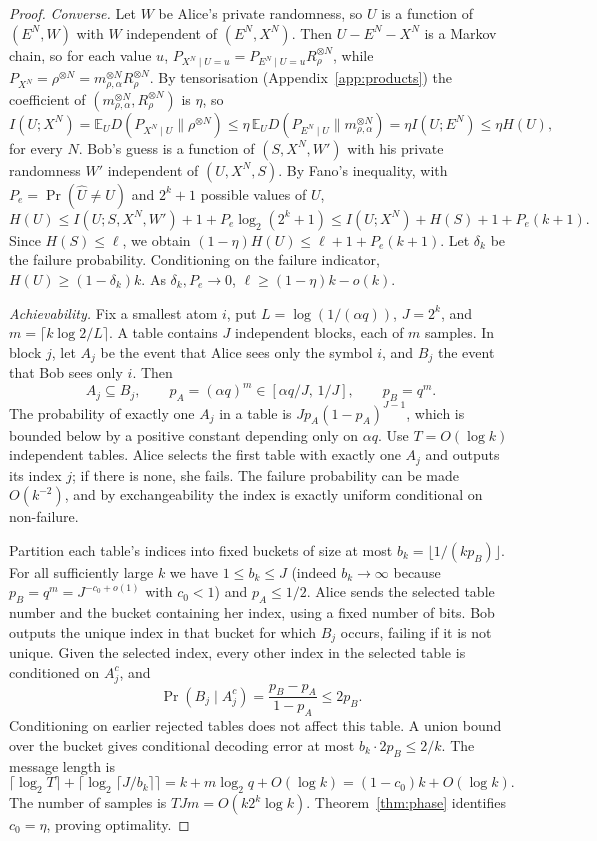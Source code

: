 \documentclass[11pt,a4paper]{article}
\numberwithin{equation}{section}
\theoremstyle{definition}
\theoremstyle{remark}
\newcommand{\KL}{D}
\newcommand{\E}{\mathbb E}
\newcommand{\mra}{m_{\rho,\alpha}}
\begin{document}
\begin{proof}
\emph{Converse.} Let \(W\) be Alice's private randomness, so \(U\) is a
function of \((E^N,W)\) with \(W\) independent of \((E^N,X^N)\). Then
\(U-E^N-X^N\) is a Markov chain, so for each value \(u\),
\(P_{X^N\mid U=u}=P_{E^N\mid U=u}R_\rho^{\otimes N}\), while
\(P_{X^N}=\rho^{\otimes N}=\mra^{\otimes N}R_\rho^{\otimes N}\). By
tensorisation (Appendix~\ref{app:products}) the coefficient of
\((\mra^{\otimes N},R_\rho^{\otimes N})\) is \(\eta\), so
\[
I(U;X^N)=\E_U\KL(P_{X^N\mid U}\|\rho^{\otimes N})
\le\eta\,\E_U\KL(P_{E^N\mid U}\|\mra^{\otimes N})=\eta I(U;E^N)\le\eta H(U),
\]
for every \(N\). Bob's guess is a function of \((S,X^N,W')\) with his
private randomness \(W'\) independent of \((U,X^N,S)\). By Fano's
inequality, with \(P_e=\Pr(\hat U\ne U)\) and \(2^k+1\) possible values of
\(U\),
\[
H(U)\le I(U;S,X^N,W')+1+P_e\log_2(2^k+1)
\le I(U;X^N)+H(S)+1+P_e(k+1).
\]
Since \(H(S)\le\ell\), we obtain
\((1-\eta)H(U)\le\ell+1+P_e(k+1)\). Let \(\delta_k\) be the failure
probability. Conditioning on the failure indicator,
\(H(U)\ge(1-\delta_k)k\). As \(\delta_k,P_e\to0\),
\(\ell\ge(1-\eta)k-o(k)\).

\emph{Achievability.} Fix a smallest atom \(i\), put
\(L=\log(1/(\alpha q))\), \(J=2^k\), and \(m=\lceil k\log2/L\rceil\). A table
contains \(J\) independent blocks, each of \(m\) samples. In block \(j\), let
\(A_j\) be the event that Alice sees only the symbol \(i\), and \(B_j\) the
event that Bob sees only \(i\). Then
\[
A_j\subseteq B_j,\qquad
p_A=(\alpha q)^m\in[\alpha q/J,\,1/J],\qquad p_B=q^m .
\]
The probability of exactly one \(A_j\) in a table is
\(Jp_A(1-p_A)^{J-1}\), which is bounded below by a positive constant
depending only on \(\alpha q\). Use \(T=O(\log k)\) independent tables.
Alice selects the first table with exactly one \(A_j\) and outputs its
index \(j\); if there is none, she fails. The failure probability can be
made \(O(k^{-2})\), and by exchangeability the index is exactly uniform
conditional on non-failure.

Partition each table's indices into fixed buckets of size at most
\(b_k=\lfloor1/(kp_B)\rfloor\). For all sufficiently large \(k\) we have
\(1\le b_k\le J\) (indeed \(b_k\to\infty\) because
\(p_B=q^m=J^{-c_0+o(1)}\) with \(c_0<1\)) and \(p_A\le1/2\). Alice sends the
selected table number and the bucket containing her index, using a fixed
number of bits. Bob outputs the unique index in that bucket for which
\(B_j\) occurs, failing if it is not unique. Given the selected index, every
other index in the selected table is conditioned on \(A_j^c\), and
\[
\Pr(B_j\mid A_j^c)=\frac{p_B-p_A}{1-p_A}\le2p_B .
\]
Conditioning on earlier rejected tables does not affect this table. A union
bound over the bucket gives conditional decoding error at most
\(b_k\cdot2p_B\le2/k\). The message length is
\[
\lceil\log_2T\rceil+\lceil\log_2\lceil J/b_k\rceil\rceil
=k+m\log_2 q+O(\log k)=(1-c_0)k+O(\log k).
\]
The number of samples is \(TJm=O(k2^k\log k)\). Theorem~\ref{thm:phase}
identifies \(c_0=\eta\), proving optimality.
\end{proof}
\end{document}

